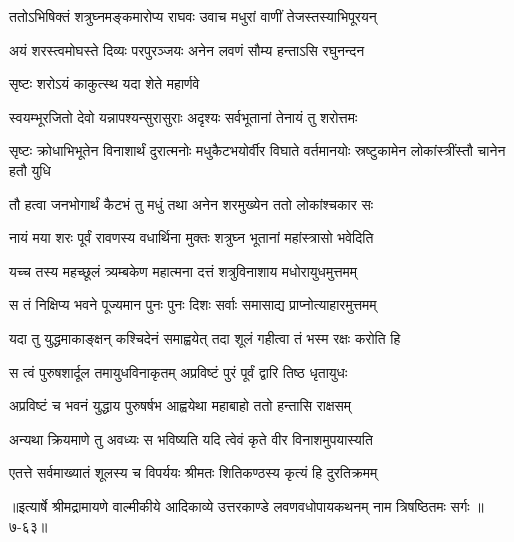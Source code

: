 \twolineshloka
{ततोऽभिषिक्तं शत्रुघ्नमङ्कमारोप्य राघवः}
{उवाच मधुरां वाणीं तेजस्तस्याभिपूरयन्} %

\twolineshloka
{अयं शरस्त्वमोघस्ते दिव्यः परपुरञ्जयः}
{अनेन लवणं सौम्य हन्ताऽसि रघुनन्दन} %

\onelineshloka
{सृष्टः शरोऽयं काकुत्स्थ यदा शेते महार्णवे} %

\twolineshloka
{स्वयम्भूरजितो देवो यन्नापश्यन्सुरासुराः}
{अदृश्यः सर्वभूतानां तेनायं तु शरोत्तमः} %

\threelineshloka
{सृष्टः क्रोधाभिभूतेन विनाशार्थं दुरात्मनोः}
{मधुकैटभयोर्वीर विघाते वर्तमानयोः}
{स्रष्टुकामेन लोकांस्त्रींस्तौ चानेन हतौ युधि} %

\twolineshloka
{तौ हत्वा जनभोगार्थं कैटभं तु मधुं तथा}
{अनेन शरमुख्येन ततो लोकांश्चकार सः} %

\twolineshloka
{नायं मया शरः पूर्वं रावणस्य वधार्थिना}
{मुक्तः शत्रुघ्न भूतानां महांस्त्रासो भवेदिति} %

\twolineshloka
{यच्च तस्य महच्छूलं त्र्यम्बकेण महात्मना}
{दत्तं शत्रुविनाशाय मधोरायुधमुत्तमम्} %

\twolineshloka
{स तं निक्षिप्य भवने पूज्यमान पुनः पुनः}
{दिशः सर्वाः समासाद्य प्राप्नोत्याहारमुत्तमम्} %

\twolineshloka
{यदा तु युद्धमाकाङ्क्षन् कश्चिदेनं समाह्वयेत्}
{तदा शूलं गहीत्वा तं भस्म रक्षः करोति हि} %

\twolineshloka
{स त्वं पुरुषशार्दूल तमायुधविनाकृतम्}
{अप्रविष्टं पुरं पूर्वं द्वारि तिष्ठ धृतायुधः} %

\twolineshloka
{अप्रविष्टं च भवनं युद्धाय पुरुषर्षभ}
{आह्वयेथा महाबाहो ततो हन्तासि राक्षसम्} %

\twolineshloka
{अन्यथा क्रियमाणे तु अवध्यः स भविष्यति}
{यदि त्वेवं कृते वीर विनाशमुपयास्यति} %

\twolineshloka
{एतत्ते सर्वमाख्यातं शूलस्य च विपर्ययः}
{श्रीमतः शितिकण्ठस्य कृत्यं हि दुरतिक्रमम्} %


॥इत्यार्षे श्रीमद्रामायणे वाल्मीकीये आदिकाव्ये उत्तरकाण्डे लवणवधोपायकथनम् नाम त्रिषष्ठितमः सर्गः ॥७-६३॥
